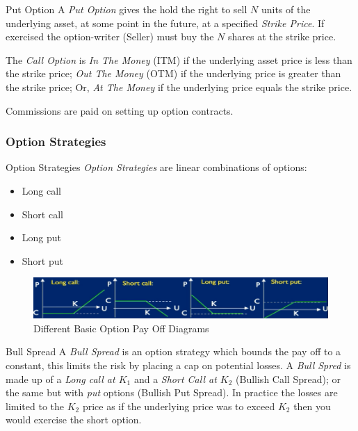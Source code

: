 \documentclass[11pt,a4paper]{article}
\begin{document}
\begin{definition}{Put Option}
  A \textit{Put Option} gives the hold the right to sell $N$ units of the underlying asset, at some point in the future, at a specified \textit{Strike Price}. If exercised the option-writer (Seller) must buy the $N$ shares at the strike price.
  \par The \textit{Call Option} is \textit{In The Money} (ITM) if the underlying asset price is less than the strike price; \textit{Out The Money} (OTM) if the underlying price is greater than the strike price; Or, \textit{At The Money} if the underlying price equals the strike price.
\end{definition}

\begin{remark}{Commissions are paid on setting up option contracts.}

\end{remark}

\subsubsection{Option Strategies}

\begin{proposition}{Option Strategies}
  \textit{Option Strategies} are linear combinations of options:
  \begin{itemize}
    \item Long call
    \item Short call
    \item Long put
    \item Short put
  \end{itemize}
\end{proposition}

\begin{figure}[ht!]
  \centering
  \includegraphics[width=.5\textwidth]{options.PNG}
  \caption{Different Basic Option Pay Off Diagrams}
\end{figure}

\begin{definition}{Bull Spread}
  A \textit{Bull Spread} is an option strategy which bounds the pay off to a constant, this limits the risk by placing a cap on potential losses. A \textit{Bull Spred} is made up of a \textit{Long call at $K_1$} and a \textit{Short Call at $K_2$} (Bullish Call Spread); or the same but with \textit{put} options (Bullish Put Spread). In practice the losses are limited to the $K_2$ price as if the underlying price was to exceed $K_2$ then you would exercise the short option.
\end{definition}
\end{document}
